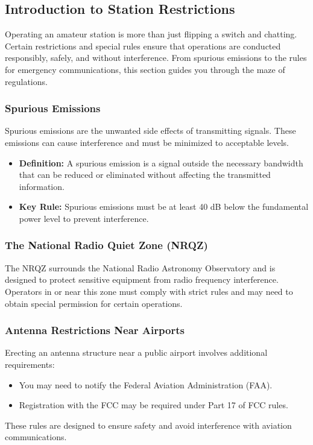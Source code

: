 \subsection*{Introduction to Station Restrictions}
Operating an amateur station is more than just flipping a switch and chatting. Certain restrictions and special rules ensure that operations are conducted responsibly, safely, and without interference. From spurious emissions to the rules for emergency communications, this section guides you through the maze of regulations.

\subsubsection*{Spurious Emissions}
Spurious emissions are the unwanted side effects of transmitting signals. These emissions can cause interference and must be minimized to acceptable levels.
\begin{itemize}
    \item \textbf{Definition:} A spurious emission is a signal outside the necessary bandwidth that can be reduced or eliminated without affecting the transmitted information.
    \item \textbf{Key Rule:} Spurious emissions must be at least 40 dB below the fundamental power level to prevent interference.
\end{itemize}

\subsubsection*{The National Radio Quiet Zone (NRQZ)}
The NRQZ surrounds the National Radio Astronomy Observatory and is designed to protect sensitive equipment from radio frequency interference. Operators in or near this zone must comply with strict rules and may need to obtain special permission for certain operations.

\subsubsection*{Antenna Restrictions Near Airports}
Erecting an antenna structure near a public airport involves additional requirements:
\begin{itemize}
    \item You may need to notify the Federal Aviation Administration (FAA).
    \item Registration with the FCC may be required under Part 17 of FCC rules.
\end{itemize}
These rules are designed to ensure safety and avoid interference with aviation communications.

